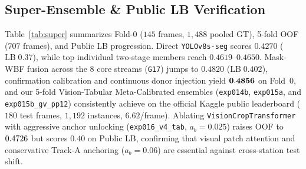 \documentclass[sigconf]{acmart}
\begin{document}
\subsection{Super-Ensemble \& Public LB Verification}
Table~\ref{tab:super} summarizes Fold-0 ($145$ frames, $1{,}488$ pooled GT), 5-fold OOF ($707$ frames), and Public LB progression. Direct \texttt{YOLOv8s-seg} scores $0.4270$ ($\mathrm{LB}\;0.37$), while top individual two-stage members reach $0.4619\text{--}0.4650$. Mask-WBF fusion across the 8 core streams (\texttt{G17}) jumps to $0.4820$ ($\mathrm{LB}\;0.402$), confirmation calibration and continuous donor injection yield $\mathbf{0.4856}$ on Fold~0, and our 5-fold Vision-Tabular Meta-Calibrated ensembles (\texttt{exp014b}, \texttt{exp015a}, and \texttt{exp015b\_\allowbreak gv\_\allowbreak pp12}) consistently achieve \textbf{\lbpq} on the official Kaggle public leaderboard ($180$ test frames, $1{,}192$ instances, $6.62$/frame). Ablating \texttt{Vision\allowbreak Crop\allowbreak Transformer} with aggressive anchor unlocking (\texttt{exp016\_\allowbreak v4\_\allowbreak tab}, $a_b{=}0.025$) raises OOF to $0.4726$ but scores $0.40$ on Public LB, confirming that visual patch attention and conservative Track-A anchoring ($a_b{=}0.06$) are essential against cross-station test shift.
\end{document}
